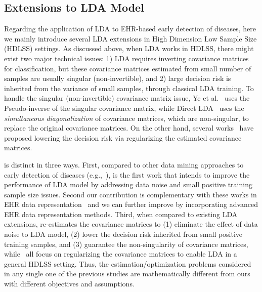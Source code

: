 
\subsection{Extensions to LDA Model}

Regarding the application of LDA to EHR-based early detection of diseases, here we mainly introduce several LDA extensions in High Dimension Low Sample Size (HDLSS) settings.
As discussed above, when LDA works in HDLSS, there might exist two major technical issues: 1) LDA requires inverting covariance matrices for classification, but these covariance matrices estimated from small number of samples are usually singular (non-invertible), and 2) large decision risk is inherited from the variance of small samples, through classical LDA training.
To handle the singular (non-invertible) covariance matrix issue, Ye et al.~\cite{ye2004optimization} uses the Pseudo-inverse of the singular covariance matrix, while Direct LDA~\cite{lu2003face,gao2006direct} uses the \emph{simultaneous diagonalization} of covariance matrices, which are non-singular, to replace the original covariance matrices.
On the other hand, several works~\cite{clemmensen2011sparse,qiao2008effective,shao2011sparse} have proposed lowering the decision risk via regularizing the estimated covariance matrices.


\TheName{} is distinct in three ways.
First, compared to other data mining approaches to early detection of diseases (e.g.,~\cite{Lindstrom01032003,riskprediction,zheng_predictive_2015,yoo_data_2011}), \TheName{} is the first work that intends to improve the performance of LDA model by addressing data noise and small positive training sample size issues.
Second our contribution is complementary with these works in EHR data representation~\cite{wang_towards_2012,wang_framework_2012,liu_temporal_2015} and we can further improve \TheName{} by incorporating advanced EHR data representation methods.
Third, when compared to existing LDA extensions, \TheName{} re-estimates the covariance matrices to (1)  eliminate the effect of data noise to LDA model, (2) lower the decision risk inherited from  small positive training samples, and (3) guarantee the non-singularity of covariance matrices, while~\cite{ye2004optimization,lu2003face,gao2006direct,clemmensen2011sparse,qiao2008effective,shao2011sparse} all focus on regularizing the covariance matrices to enable LDA in a general HDLSS setting.
Thus, the estimation/optimization problems considered in any single one of the previous studies are mathematically different from ours with different objectives and assumptions.


